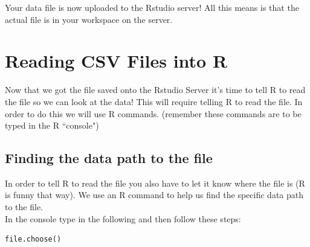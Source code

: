 \documentclass{article}\usepackage[]{graphicx}\usepackage[]{color}
\begin{document}
Your data file is now uploaded to the Rstudio server! All this means is that the actual file is in your workspace on the server. %





\section{Reading CSV Files into R}

Now that we got the file saved onto the Rstudio Server it's time to tell R to read the file so we can look at the data! This will require telling R to read the file. In order to do this we will use R commands. (remember these commands are to be typed in the R ``console") %

 \subsection{Finding the data path to the file}
In order to tell R to read the file you also have to let it know where the file is (R is funny that way). We use an R command to help us find the specific data path to the file. \\
In the console type in the following and then follow these steps: 
\begin{verbatim}
file.choose()
\end{verbatim}
\end{document}
